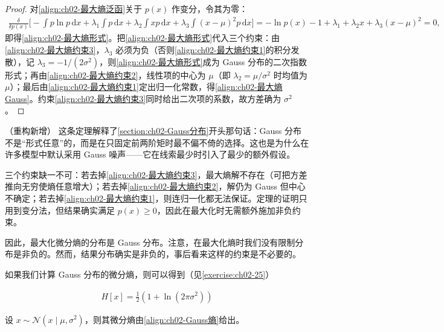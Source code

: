 \documentclass[../../main.tex]{subfiles}
\begin{document}
\begin{proof}
对\eqref{align:ch02-最大熵泛函}关于 $p(x)$ 作变分，令其为零：
\begin{align*}
  \frac{\delta}{\delta p(x)}\Big[-\int p\ln p\,\mathrm{d}x + \lambda_1\!\int p\,\mathrm{d}x + \lambda_2\!\int xp\,\mathrm{d}x + \lambda_3\!\int(x-\mu)^{2}p\,\mathrm{d}x\Big]
  = -\ln p(x) - 1 + \lambda_1 + \lambda_2x + \lambda_3(x-\mu)^{2} = 0 ,
\end{align*}
即得\eqref{align:ch02-最大熵形式}。把\eqref{align:ch02-最大熵形式}代入三个约束：由\eqref{align:ch02-最大熵约束3}，$\lambda_3$ 必须为负（否则\eqref{align:ch02-最大熵约束1}的积分发散），记 $\lambda_3=-1/(2\sigma^{2})$，则\eqref{align:ch02-最大熵形式}成为 Gauss 分布的二次指数形式；再由\eqref{align:ch02-最大熵约束2}，线性项的中心为 $\mu$（即 $\lambda_2=\mu/\sigma^{2}$ 时均值为 $\mu$）；最后由\eqref{align:ch02-最大熵约束1}定出归一化常数，得\eqref{align:ch02-最大熵Gauss}。约束\eqref{align:ch02-最大熵约束3}同时给出二次项的系数，故方差确为 $\sigma^{2}$。
\end{proof}

\begin{remark}（重构新增）
这条定理解释了\cref{section:ch02-Gauss分布}开头那句话：Gauss 分布不是“形式任意”的，而是在只固定前两阶矩时最不偏不倚的选择。这也是为什么在许多模型中默认采用 Gauss 噪声——它在线索最少时引入了最少的额外假设。

三个约束缺一不可：若去掉\eqref{align:ch02-最大熵约束3}，最大熵解不存在（可把方差推向无穷使熵任意增大）；若去掉\eqref{align:ch02-最大熵约束2}，解仍为 Gauss 但中心不确定；若去掉\eqref{align:ch02-最大熵约束1}，则连归一化都无法保证。定理的证明只用到变分法，但结果确实满足 $p(x)\geqslant0$，因此在最大化时无需额外施加非负约束。
\end{remark}

因此，最大化微分熵的分布是 Gauss 分布。注意，在最大化熵时我们没有限制分布是非负的。然而，结果分布确实是非负的，事后看来这样的约束是不必要的。

如果我们计算 Gauss 分布的微分熵，则可以得到（见\cref{exercise:ch02-25}）

\begin{align}
  H[x] = \frac{1}{2}\left(1+\ln(2\pi\sigma^{2})\right)
  \label{align:ch02-Gauss熵}
\end{align}

\begin{proposition}\label{proposition:ch02-Gauss熵}
设 $x\sim\mathcal{N}(x\mid\mu,\sigma^{2})$，则其微分熵由\eqref{align:ch02-Gauss熵}给出。
\end{proposition}
\end{document}
